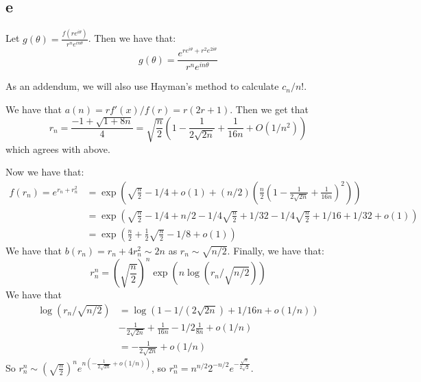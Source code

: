 \documentclass[]{article}
\begin{document}
\subsection{e}

Let $g(\theta) = \frac{f(r e^{i \theta})}{r^n e^{i n \theta}}$. Then we have that:
\begin{equation}
	g(\theta) = \frac{ e^{r e^{i \theta} + r^2 e^{2 i \theta}}}{r^n e^{i n \theta}}
\end{equation}



As an addendum, we will also use Hayman's method to calculate $c_n/n!$. 


We have that $a(n) = r f'(x)/f(r) = r(2r + 1)$. Then we get that 
\begin{equation}
	r_n = \frac{-1 + \sqrt{1 + 8n}}{4} = \sqrt{\frac{n}{2}} \left(1 - \frac{1}{2 \sqrt{2n}} + \frac{1}{16n} + O(1/n^2)\right)
\end{equation}
which agrees with above. 

Now we have that:
\begin{align*}
	f(r_n) = e^{r_n + r_n^2} &= \exp\left(\sqrt{\frac{n}{2}} - 1/4 + o(1) + (n/2)\left(\frac{n}{2} \left(1 - \frac{1}{2 \sqrt{2n}} + \frac{1}{16n}\right) ^2 \right)\right)\\
	&=
	\exp \left(
	\sqrt{\frac{n}{2}} - 1/4 + n/2 - 1/4\sqrt{\frac{n}{2}} + 1/32 - 1/4\sqrt{\frac{n}{2}} + 1/16 + 1/32 + o(1)
	\right)\\
	&=
	\exp \left(
	\frac{n}{2} + \frac{1}{2} \sqrt{\frac{n}{2}} - 1/8 + o(1)
	\right)
\end{align*}
We have that $b(r_n) = r_n + 4 r_n^2 \sim 2n$ as $r_n \sim \sqrt{n/2}$. Finally, we have that:
\begin{equation}
	r_n^n = \left(\sqrt{\frac{n}{2}}\right)^n  \exp( n  \log(r_n/ \sqrt{n/2}))
\end{equation}
We have that 
\begin{align*}
	\log(r_n/\sqrt{n/2}) &= \log(1 - 1/(2 \sqrt{2n}) + 1/16n + o(1/n))\\
	& -\frac{1}{2 \sqrt{2n}} + \frac{1}{16n} - 1/2 \frac{1}{8n} + o(1/n)\\
	&= - \frac{1}{2 \sqrt{2n}} + o(1/n)
\end{align*}
So $r_n^n \sim \left(\sqrt{\frac{n}{2}}\right)^n e^{n \left(- \frac{1}{2 \sqrt{2n}} + o(1/n)\right)}$, so $r_n^n = n^{n/2} 2^{-n/2} e^{-\frac{\sqrt{n}}{2\sqrt{2}}}$. 
\end{document}
